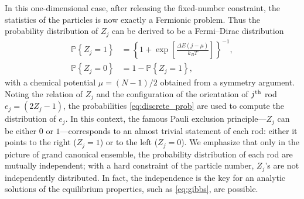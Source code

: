 \documentclass[aps,showpacs,twocolumn,floatfix,prx,superscriptaddress]{revtex4-1}
\begin{document}
In this one-dimensional case, after releasing the fixed-number
constraint, the statistics of the particles is now exactly a Fermionic problem.
Thus the probability distribution of $Z_j$ can be derived
\cite{Chandler1987,Lin2015} to be a Fermi--Dirac distribution
\begin{subequations}
    \begin{align}
        \label{eq:discrete_prob}
        \mathbb{P} \left\{ Z_j = 1\right\} & =  \left\{1+\exp\left[\frac{ \Delta
                    E \left(j - \mu \right) }{k_B T}\right]\right\}^{-1}, \\
        \mathbb{P} \left\{ Z_j = 0\right\} & = 1 - \mathbb{P} \left\{ Z_j =
            1\right\},
    \end{align}
\end{subequations}
with a chemical potential $\mu = (N-1)/2$ obtained from a symmetry argument.
Noting the relation of $Z_j$ and the configuration of the orientation of $j^{\rm
    th}$ rod $e_j = \left(2Z_j -1\right)$, the probabilities
\eqref{eq:discrete_prob} are used to compute the distribution of $e_j$. In this
context, the famous Pauli exclusion principle---$Z_j$ can be either $0$ or
$1$---corresponds to an almost trivial statement of each rod: either it points to
the right ($Z_j=1$) or to the left ($Z_j=0$).  We emphasize that only in the
picture of grand canonical ensemble, the probability distribution of each rod
are mutually independent; with a hard constraint of the particle number, $Z_j$'s
are not independently distributed. In fact, the independence is the key for an
analytic solutions of the equilibrium properties, such as \eqref{eq:gibbs}, are
possible. 
\end{document}
